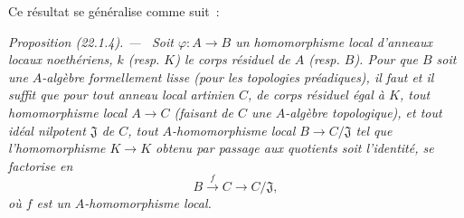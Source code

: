 \documentclass[10pt,oneside]{book}
\makeatletter
\newcommand{\setmanualcurrentlabel}[1]{\def\@currentlabel{#1}}
\newcommand{\oldpage}[2][]{%
  \setcounter{footnote}{0}%
  \marginpar{\scriptsize\textbf{#1}~|~#2}\ignorespaces}
\newenvironment{proposition}[1][]{%
  \setmanualcurrentlabel{#1}\par\medskip\noindent\itshape Proposition (#1). ---\ }{\par}
\makeatother
\begin{document}
\oldpage[0\textsubscript{IV-1}]{185}

Ce résultat se généralise comme suit~:

\begin{proposition}[22.1.4]
\label{0.22.1.4-fr}
Soit $\varphi:A\to B$ un homomorphisme local d'anneaux locaux noethériens,
$k$ (resp. $K$) le corps résiduel de $A$ (resp. $B$). Pour que $B$ soit une
$A$-algèbre formellement lisse (pour les topologies préadiques), il faut et
il suffit que pour tout anneau local artinien $C$, de corps résiduel égal à
$K$, tout homomorphisme local $A\to C$ (faisant de $C$ une $A$-algèbre
topologique), et tout idéal nilpotent $\mathfrak J$ de $C$, tout
$A$-homomorphisme local $B\to C/\mathfrak J$ tel que l'homomorphisme
$K\to K$ obtenu par passage aux quotients soit l'identité, se factorise en
\[
  B\xrightarrow{f}C\longrightarrow C/\mathfrak J,
\]
où $f$ est un $A$-homomorphisme local.
\end{proposition}
\end{document}
